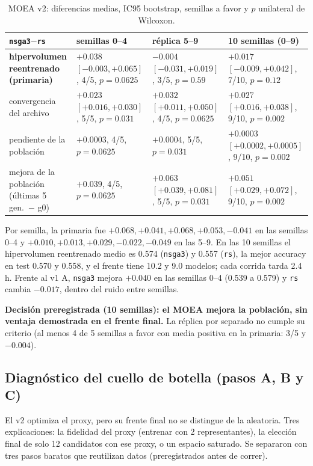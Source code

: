 \documentclass[11pt,a4paper]{article}
\begin{document}
\begin{table}[h]
\centering\footnotesize
\begin{tabular}{p{2.8cm}p{3.7cm}p{3.7cm}p{3.7cm}}
\toprule
\texttt{nsga3}$-$\texttt{rs} & semillas 0--4 & réplica 5--9 & 10 semillas (0--9)\\
\midrule
\textbf{hipervolumen reentrenado (primaria)} & $+0.038$ $[-0.003,+0.065]$, 4/5, $p=0.0625$ & $-0.004$ $[-0.031,+0.019]$, 3/5, $p=0.59$ & $\mathbf{+0.017}$ $[-0.009,+0.042]$, 7/10, $p=0.12$\\
convergencia del archivo & $+0.023$ $[+0.016,+0.030]$, 5/5, $p=0.031$ & $+0.032$ $[+0.011,+0.050]$, 4/5, $p=0.0625$ & $+0.027$ $[+0.016,+0.038]$, 9/10, $p=0.002$\\
pendiente de la población & $+0.0003$, 4/5, $p=0.0625$ & $+0.0004$, 5/5, $p=0.031$ & $+0.0003$ $[+0.0002,+0.0005]$, 9/10, $p=0.002$\\
mejora de la población (últimas 5 gen.\ $-$ g0) & $+0.039$, 4/5, $p=0.0625$ & $+0.063$ $[+0.039,+0.081]$, 5/5, $p=0.031$ & $+0.051$ $[+0.029,+0.072]$, 9/10, $p=0.002$\\
\bottomrule
\end{tabular}
\caption{MOEA v2: diferencias medias, IC95 bootstrap, semillas a favor y $p$ unilateral de Wilcoxon.}
\label{tab:moea2}
\end{table}

Por semilla, la primaria fue $+0.068,+0.041,+0.068,+0.053,-0.041$ en las semillas 0--4 y $+0.010,+0.013,+0.029,-0.022,-0.049$ en las 5--9. En las 10 semillas el hipervolumen reentrenado medio es 0.574 (\texttt{nsga3}) y 0.557 (\texttt{rs}), la mejor accuracy en test 0.570 y 0.558, y el frente tiene 10.2 y 9.0 modelos; cada corrida tarda 2.4 h. Frente al v1 A, \texttt{nsga3} mejora $+0.040$ en las semillas 0--4 (0.539 a 0.579) y \texttt{rs} cambia $-0.017$, dentro del ruido entre semillas.

\textbf{Decisión preregistrada (10 semillas): el MOEA mejora la población, sin ventaja demostrada en el frente final.} La réplica por separado no cumple su criterio (al menos 4 de 5 semillas a favor con media positiva en la primaria: 3/5 y $-0.004$).

\subsection*{Diagnóstico del cuello de botella (pasos A, B y C)}
El v2 optimiza el proxy, pero su frente final no se distingue de la aleatoria. Tres explicaciones: la fidelidad del proxy (entrenar con 2 representantes), la elección final de solo 12 candidatos con ese proxy, o un espacio saturado. Se separaron con tres pasos baratos que reutilizan datos (preregistrados antes de correr).
\end{document}
